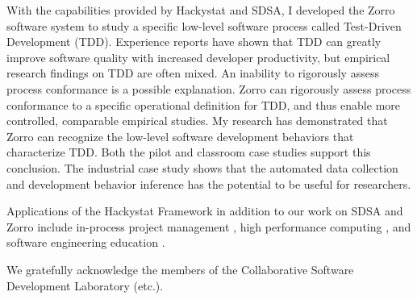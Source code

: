 \documentclass[smallextended]{svjour3}     %
\begin{document}
With the capabilities provided by Hackystat and SDSA, I developed the Zorro
software system to study a specific low-level software process called
Test-Driven Development (TDD). Experience reports have shown that TDD can
greatly improve software quality with increased developer productivity, but
empirical research findings on TDD are often mixed. An inability to
rigorously assess process conformance is a possible explanation. Zorro can
rigorously assess process conformance to a specific operational definition
for TDD, and thus enable more controlled, comparable empirical studies. My
research has demonstrated that Zorro can recognize the low-level software
development behaviors that characterize TDD. Both the pilot and classroom
case studies support this conclusion. The industrial case study shows that
the automated data collection and development behavior inference has the
potential to be useful for researchers.

Applications of the Hackystat Framework in addition to our work on SDSA and
Zorro include in-process project management \cite{csdl2-04-11}, high
performance computing \cite{csdl2-04-22}, and software engineering
education \cite{csdl2-03-12}.

\begin{acknowledgements}
We gratefully acknowledge the members of the Collaborative Software Development Laboratory (etc.).
\end{acknowledgements}


\end{document}
